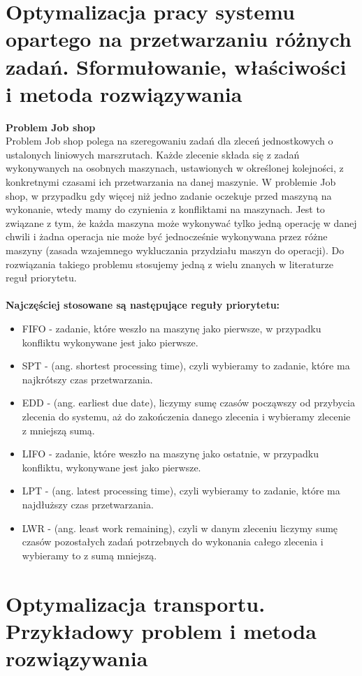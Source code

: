 \documentclass[10pt, a
4paper]{article}
\begin{document}
\section{Optymalizacja pracy systemu opartego na przetwarzaniu różnych zadań. Sformułowanie, właściwości i metoda rozwiązywania}
\noindent \textbf{Problem Job shop}\\
\indent Problem Job shop polega na szeregowaniu zadań dla zleceń jednostkowych o ustalonych liniowych marszrutach. Każde zlecenie składa się z zadań wykonywanych na osobnych maszynach, ustawionych w określonej kolejności, z konkretnymi czasami ich przetwarzania na danej maszynie.
W problemie Job shop, w przypadku gdy więcej niż jedno zadanie oczekuje przed maszyną na wykonanie, wtedy mamy do czynienia z konfliktami na maszynach. Jest to związane z tym, że każda maszyna może wykonywać tylko jedną operację w danej chwili i żadna operacja nie może być jednocześnie wykonywana przez różne maszyny (zasada wzajemnego wykluczania przydziału maszyn do operacji). Do rozwiązania takiego problemu stosujemy jedną z wielu znanych w literaturze reguł priorytetu.
\\\\
\textbf{Najczęściej stosowane są następujące reguły priorytetu:}
\begin{itemize}
\item FIFO - zadanie, które weszło na maszynę jako pierwsze, w przypadku konfliktu wykonywane jest jako pierwsze.
\item SPT - (ang. shortest processing time), czyli wybieramy to zadanie, które ma najkrótszy czas przetwarzania.
\item EDD - (ang. earliest due date), liczymy sumę czasów począwszy od przybycia zlecenia do systemu, aż do zakończenia danego zlecenia i wybieramy zlecenie z mniejszą sumą.
\item LIFO - zadanie, które weszło na maszynę jako ostatnie, w przypadku konfliktu, wykonywane jest jako pierwsze.
\item LPT - (ang. latest processing time), czyli wybieramy to zadanie, które ma najdłuższy czas przetwarzania.
\item LWR - (ang. least work remaining), czyli w danym zleceniu liczymy sumę czasów pozostałych zadań potrzebnych do wykonania całego zlecenia i wybieramy to z sumą mniejszą.
\end{itemize}


\newpage
\section{Optymalizacja transportu. Przykładowy problem i metoda rozwiązywania}
\end{document}
